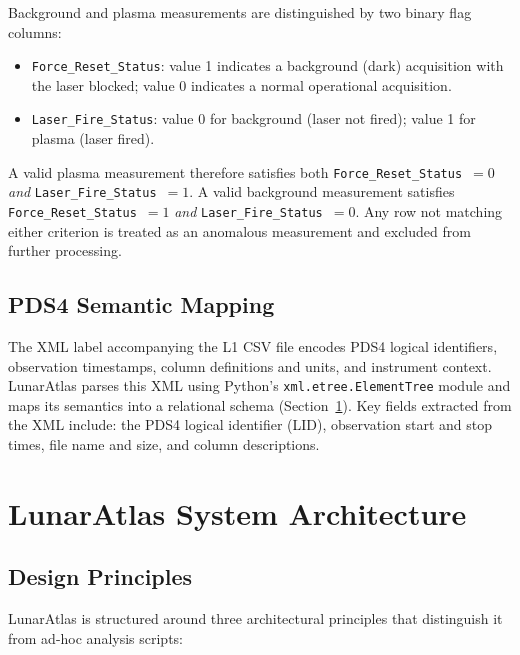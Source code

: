 \documentclass[a4paper,twocolumn,10pt]{article}
\begin{document}
Background and plasma measurements are distinguished by two binary
flag columns:
\begin{itemize}[nosep,leftmargin=*]
  \item \texttt{Force\_Reset\_Status}: value 1 indicates a background
    (dark) acquisition with the laser blocked; value 0 indicates a
    normal operational acquisition.
  \item \texttt{Laser\_Fire\_Status}: value 0 for background (laser not
    fired); value 1 for plasma (laser fired).
\end{itemize}

A valid plasma measurement therefore satisfies both
\texttt{Force\_Reset\_Status}~$=0$ \emph{and}
\texttt{Laser\_Fire\_Status}~$=1$.  A valid background measurement
satisfies \texttt{Force\_Reset\_Status}~$=1$ \emph{and}
\texttt{Laser\_Fire\_Status}~$=0$.  Any row not matching either
criterion is treated as an anomalous measurement and excluded from
further processing.

\subsection{PDS4 Semantic Mapping}

The XML label accompanying the L1 CSV file encodes PDS4 logical
identifiers, observation timestamps, column definitions and units, and
instrument context.  LunarAtlas parses this XML using Python's
\texttt{xml.etree.ElementTree} module and maps its semantics into a
relational schema (Section~\ref{sec:architecture}).  Key fields
extracted from the XML include: the PDS4 logical identifier (LID),
observation start and stop times, file name and size, and column
descriptions.


\section{LunarAtlas System Architecture}
\label{sec:architecture}

\subsection{Design Principles}

LunarAtlas is structured around three architectural principles that
distinguish it from ad-hoc analysis scripts:
\end{document}
